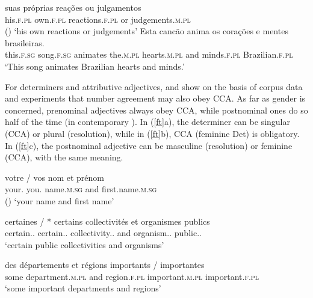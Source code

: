 \eal
\label{fo}
\ex 
\gll suas pr\'{o}prias rea\c{c}\~{o}es ou julgamentos\footnotemark\\
     his.\textsc{f.pl} own.\textsc{f.pl} reactions.\textsc{f.pl} or judgements.\textsc{m.pl} \\\hfill()
\glt `his own reactions or judgements'
\ex 
\gll Esta canc\~{a}o anima os cora\c{c}\~{o}es e mentes brasileiras.\footnotemark\\
     this.\textsc{f.sg}  song.\textsc{f.sg} animates the.\textsc{m.pl} hearts.\textsc{m.pl} and minds.\textsc{f.pl} Brazilian.\textsc{f.pl} \\
\glt `This song animates Brazilian hearts and minds.'
\zl

For  determiners and attributive adjectives, \citet{An:Abeille:17} and
\citet{Abeille:An:Shiraishi:18} show on the basis of corpus data and experiments that number
agreement may also obey CCA. As far as gender is concerned, prenominal adjectives always obey CCA,
while postnominal ones do so half of the time (in contemporary ). In (\ref{ft}a), the
determiner can be singular (CCA) or plural (resolution), while in (\ref{ft}b), CCA (feminine Det) is
obligatory. In (\ref{ft}c), the postnominal adjective can be masculine (resolution) or feminine
(CCA), with the same meaning. 

\eal
\label{ft}
\ex  
\gll votre / vos nom et pr\'{e}nom\footnotemark\\
     your.\SG{} {} you.\PL{} name.\textsc{m.sg} and first.name.\textsc{m.sg} \\\hfill()
\glt `your name and first name'

\ex 
\gll certaines          / *   certains collectivités et organismes publics\footnotemark\\
     certain.\F.\PL{} {} {} certain.\MAS.\PL{} collectivity.\F.\PL{} and organism.\MAS.\PL{} public.\MAS.\PL{} \\
\glt `certain public collectivities and organisms' 

\ex 
\gll des d\'{e}partements et r\'{e}gions importants / importantes\\
     some department.\textsc{m.pl} and region.\textsc{f.pl} important.\textsc{m.pl} {} important.\textsc{f.pl}\\
\glt `some important departments and regions'
\zl


